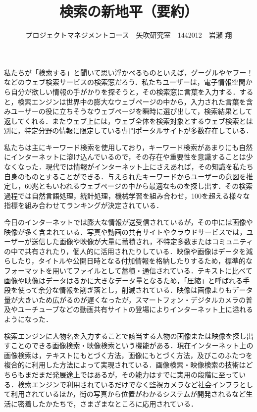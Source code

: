 \documentclass[uplatex,twocolumn,dvipdfmx]{jsarticle}
\title{\vspace{-5mm}\fontsize{14pt}{0pt}\selectfont 検索の新地平（要約）}
\author{\normalsize プロジェクトマネジメントコース　矢吹研究室　1442012　岩瀬 翔}
\date{}
\begin{document}
\fontsize{10.5pt}{\baselineskip}\selectfont
\maketitle





私たちが「検索する」と聞いて思い浮かべるものといえば，グーグルやヤフー！などのウェブ検索サービスの検索窓だろう．私たちユーザーは，電子情報空間から自分が欲しい情報の手がかりを探そうと，その検索窓に言葉を入力する．すると，検索エンジンは世界中の膨大なウェブページの中から，入力された言葉を含みユーザーの役に立ちそうなウェブページを瞬時に選び出して，検索結果として返してくれる．またウェブ上には，ウェブ全体を検索対象とするウェブ検索とは別に，特定分野の情報に限定している専門ポータルサイトが多数存在している．

私たちは主にキーワード検索を使用しており，キーワード検索があまりにも自然にインターネットに溶け込んでいるので，その存在や重要性を意識することは少なくなった．現代では情報がインターネット上にさえあれば，その知識を私たち自身のものとすることができる．与えられたキーワードからユーザーの意図を推定し，60兆ともいわれるウェブページの中から最適なものを探し出す．その検索過程では自然言語処理，統計処理，機械学習を組み合わせ，100を超える様々な指標を組み合わせてランキングが決定されている．

今日のインターネットでは膨大な情報が送受信されているが，その中には画像や映像が多く含まれている．写真や動画の共有サイトやクラウドサービスでは，ユーザーが送信した画像や映像が大量に蓄積され，不特定多数またはコミュニティの中で共有されたり，個人的に活用されたりしている．映像や画像はデータを減らしたり，タイトルや公開日時となる付加情報を格納したりするため，標準的なフォーマットを用いてファイルとして蓄積・通信されている．テキストに比べて画像や映像はデータはるかに大きなデータ量となるため，「圧縮」と呼ばれる手段を使って余分な情報を削ぎ落とし，削減されている．映像は画像よりもデータ量が大きいため広がるのが遅くなったが，スマートフォン・デジタルカメラの普及やユーチューブなどの動画共有サイトの登場によりインターネット上に溢れるようになった．

検索エンジンに人物名を入力することで該当する人物の画像または映像を探し出すことのできる画像検索・映像検索という機能がある．現在インターネット上の画像検索は，テキストにもとづく方法，画像にもとづく方法，及びこのふたつを複合的に利用した方法によって実現されている．画像検索・映像検索の技術はどちらもまだまだ発展途上ではあるが，その能力はすでに実用の段階に至っている．検索エンジンで利用されているだけでなく監視カメラなど社会インフラとして利用されているほか，街の写真から位置がわかるシステムが開発されるなど生活に密着したかたちで，さまざまなところに応用されている．
\end{document}
